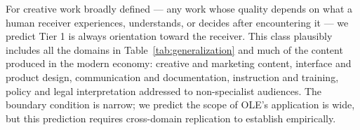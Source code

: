 For creative work broadly defined --- any work whose quality depends on what a human
receiver experiences, understands, or decides after encountering it --- we predict Tier 1
is always orientation toward the receiver. This class plausibly includes all the domains
in Table~\ref{tab:generalization} and much of the content produced in the modern economy:
creative and marketing content, interface and product design, communication and
documentation, instruction and training, policy and legal interpretation addressed to
non-specialist audiences. The boundary condition is narrow; we predict the scope of OLE's
application is wide, but this prediction requires cross-domain replication to establish
empirically.
